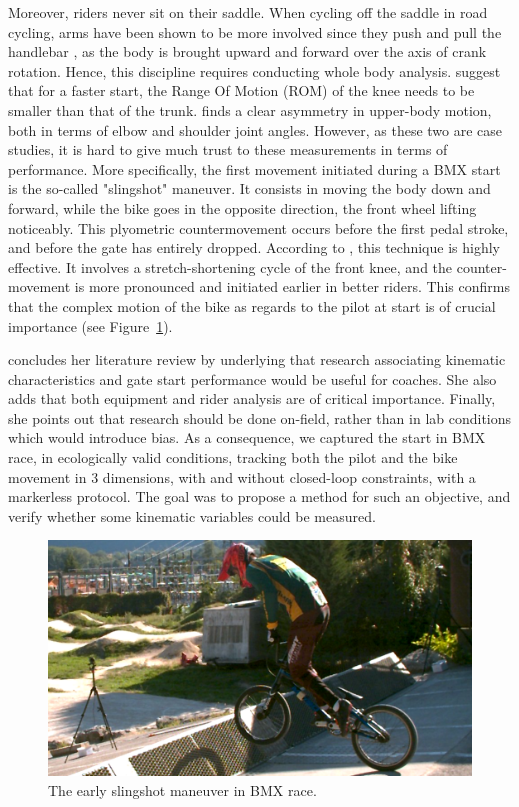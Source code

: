 Moreover, riders never sit on their saddle. When cycling off the saddle in road cycling, arms have been shown to be more involved since they push and pull the handlebar \cite{Stone1993}, as the body is brought upward and forward over the axis of crank rotation. Hence, this discipline requires conducting whole body analysis. \cite{Gianikellis2011} suggest that for a faster start, the Range Of Motion (ROM) of the knee needs to be smaller than that of the trunk. \cite{Kalichova2013} finds a clear asymmetry in upper-body motion, both in terms of elbow and shoulder joint angles. However, as these two are case studies, it is hard to give much trust to these measurements in terms of performance. More specifically, the first movement initiated during a BMX start is the so-called "slingshot" maneuver. It consists in moving the body down and forward, while the bike goes in the opposite direction, the front wheel lifting noticeably. This plyometric countermovement occurs before the first pedal stroke, and before the gate has entirely dropped. According to \cite{Gross2017}, this technique is highly effective. It involves a stretch-shortening cycle of the front knee, and the counter-movement is more pronounced and initiated earlier in better riders. This confirms that the complex motion of the bike as regards to the pilot at start is of crucial importance (see Figure~\ref{fig_bmxstart}). 

\cite{Grigg2017} concludes her literature review by underlying that research associating kinematic characteristics and gate start performance would be useful for coaches. She also adds that both equipment and rider analysis are of critical importance. Finally, she points out that research should be done on-field, rather than in lab conditions which would introduce bias. As a consequence, we captured the start in BMX race, in ecologically valid conditions, tracking both the pilot and the bike movement in 3 dimensions, with and without closed-loop constraints, with a markerless protocol. The goal was to propose a method for such an objective, and verify whether some kinematic variables could be measured.

\begin{figure}[hbtp]
	\centering
	\def\svgwidth{1\columnwidth}
	\fontsize{10pt}{10pt}\selectfont
	\includegraphics[width=\linewidth]{"../Chap7/Figures/BMXStart.PNG"}
	\caption{The early slingshot maneuver in BMX race.}
	\label{fig_bmxstart}
\end{figure}


